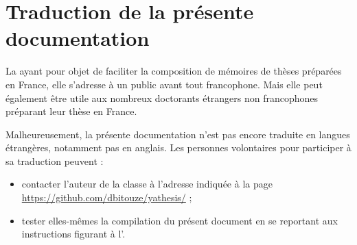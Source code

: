 \chapter{Traduction de la présente documentation}\label{cha-trad-de-la-pres}

%
%

La \yatCl{} ayant pour objet de faciliter la composition de mémoires de thèses
préparées en France, elle s'adresse à un public avant tout francophone. Mais
elle peut également être utile aux nombreux doctorants étrangers non
francophones préparant leur thèse en France.

Malheureusement, la présente documentation n'est pas encore traduite en langues
étrangères, notamment pas en anglais. Les personnes volontaires pour participer
à sa traduction peuvent :
\begin{itemize}
\item contacter l'auteur de la classe à l'adresse indiquée à la page
  \url{https://github.com/dbitouze/yathesis/} ;
\item tester elles-mêmes la compilation du présent document en se reportant aux
  instructions figurant à l'.
\end{itemize}


